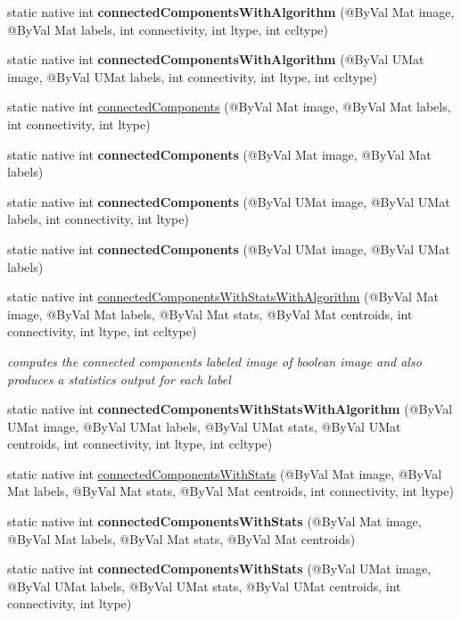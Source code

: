 \begin{DoxyCompactItemize}
\item 
static native int {\bfseries connected\+Components\+With\+Algorithm} (@By\+Val Mat image, @By\+Val Mat labels, int connectivity, int ltype, int ccltype)
\item 
static native int {\bfseries connected\+Components\+With\+Algorithm} (@By\+Val U\+Mat image, @By\+Val U\+Mat labels, int connectivity, int ltype, int ccltype)
\item 
static native int \hyperlink{group__imgproc__shape_gad3b372e7de7a736c55ae6707238019cf}{connected\+Components} (@By\+Val Mat image, @By\+Val Mat labels, int connectivity, int ltype)
\item 
static native int {\bfseries connected\+Components} (@By\+Val Mat image, @By\+Val Mat labels)
\item 
static native int {\bfseries connected\+Components} (@By\+Val U\+Mat image, @By\+Val U\+Mat labels, int connectivity, int ltype)
\item 
static native int {\bfseries connected\+Components} (@By\+Val U\+Mat image, @By\+Val U\+Mat labels)
\item 
static native int \hyperlink{group__imgproc__shape_gaed0a27b064f9360aa2cdfc5368f6c81c}{connected\+Components\+With\+Stats\+With\+Algorithm} (@By\+Val Mat image, @By\+Val Mat labels, @By\+Val Mat stats, @By\+Val Mat centroids, int connectivity, int ltype, int ccltype)
\begin{DoxyCompactList}\small\item\em computes the connected components labeled image of boolean image and also produces a statistics output for each label \end{DoxyCompactList}\item 
static native int {\bfseries connected\+Components\+With\+Stats\+With\+Algorithm} (@By\+Val U\+Mat image, @By\+Val U\+Mat labels, @By\+Val U\+Mat stats, @By\+Val U\+Mat centroids, int connectivity, int ltype, int ccltype)
\item 
static native int \hyperlink{group__imgproc__shape_gab229ea94bd41ec2bbcda17ba9d2968fe}{connected\+Components\+With\+Stats} (@By\+Val Mat image, @By\+Val Mat labels, @By\+Val Mat stats, @By\+Val Mat centroids, int connectivity, int ltype)
\item 
static native int {\bfseries connected\+Components\+With\+Stats} (@By\+Val Mat image, @By\+Val Mat labels, @By\+Val Mat stats, @By\+Val Mat centroids)
\item 
static native int {\bfseries connected\+Components\+With\+Stats} (@By\+Val U\+Mat image, @By\+Val U\+Mat labels, @By\+Val U\+Mat stats, @By\+Val U\+Mat centroids, int connectivity, int ltype)

\end{DoxyCompactItemize}
